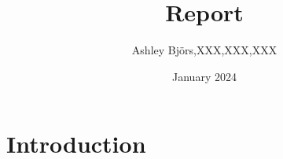 \documentclass{article}
\title{Report}
\author{Ashley Björs,XXX,XXX,XXX}
\date{January 2024}
\begin{document}
\maketitle

\section{Introduction}
\end{document}
